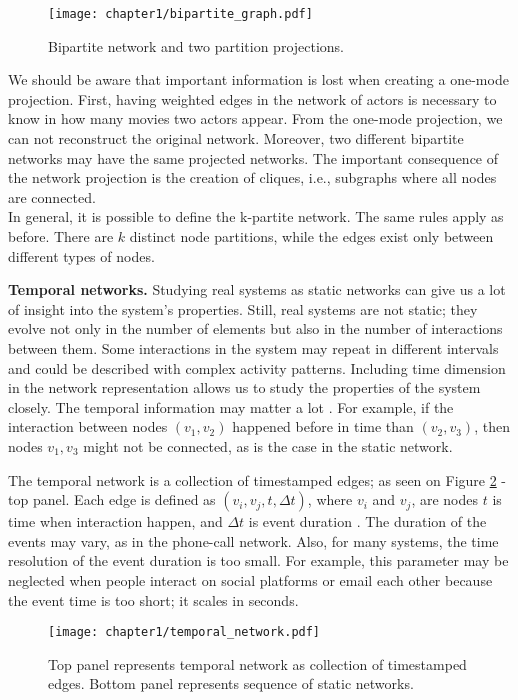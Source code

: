 \begin{figure}[h]
	\centering
	\texttt{[image: chapter1/bipartite\_graph.pdf]} 
	\caption[Bipartite network.]{Bipartite network and two partition projections.}
	\label{fig:bipartite}
\end{figure}

We should be aware that important information is lost when creating a one-mode projection. First, having weighted edges in the network of actors is necessary to know in how many movies two actors appear. From the one-mode projection, we can not reconstruct the original network. Moreover, two different bipartite networks may have the same projected networks. The important consequence of the network projection is the creation of cliques, i.e., subgraphs where all nodes are connected. \\
In general, it is possible to define the k-partite network. The same rules apply as before. There are $k$ distinct node partitions, while the edges exist only between different types of nodes.

\textbf{Temporal networks.}
Studying real systems as static networks can give us a lot of insight into the system's properties. Still, real systems are not static; they evolve not only in the number of elements but also in the number of interactions between them. Some interactions in the system may repeat in different intervals and could be described with complex activity patterns. Including time dimension in the network representation allows us to study the properties of the system closely. The temporal information may matter a lot \cite{holme2012}. For example, if the interaction between nodes $(v_1, v_2)$ happened before in time than  $(v_2, v_3)$, then nodes $v_1, v_3$ might not be connected, as is the case in the static network. 

The temporal network is a collection of timestamped edges; as seen on Figure \ref{fig:temporal} - top panel. Each edge is defined as $(v_i, v_j, t, \Delta t)$, where $v_i$ and $v_j$, are nodes $t$ is time when interaction happen, and $\Delta t$ is event duration \cite{guide_temporal}. The duration of the events may vary, as in the phone-call network. Also, for many systems, the time resolution of the event duration is too small. For example, this parameter may be neglected when people interact on social platforms or email each other because the event time is too short; it scales in seconds.

\begin{figure}[h]
	\centering
	\texttt{[image: chapter1/temporal\_network.pdf]} 
	\caption[Temporal network.]{Top panel represents temporal network as collection of timestamped edges. Bottom panel represents sequence of static networks.}
	\label{fig:temporal}
\end{figure}

